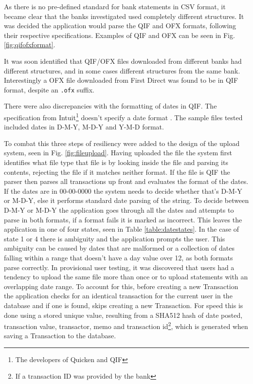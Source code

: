 As there is no pre-defined standard for bank statements in CSV format, it became clear that the banks investigated used completely different structures. It was decided the application would parse the QIF and OFX formats, following their respective specifications. Examples of QIF and OFX can be seen in Fig. \ref{fig:qifofxformat}.

It was soon identified that QIF/OFX files downloaded from different banks had different structures, and in some cases different structures from the same bank. Interestingly a OFX file downloaded from First Direct was found to be in QIF format, despite an \lstinline$.ofx$ suffix.

There were also discrepancies with the formatting of dates in QIF. The specification from Intuit\footnote{The developers of Quicken and QIF} doesn't specify a date format \cite{quiken2010qif}. The sample files tested included dates in D-M-Y, M-D-Y and Y-M-D format.



To combat this three steps of resiliency were added to the design of the upload system, seen in Fig. \ref{fig:fileupload}.
%
Having uploaded the file the system first identifies what file type that file is by looking inside the file and parsing its contents, rejecting the file if it matches neither format.
%
If the file is QIF the parser then parses all transactions up front and evaluates the format of the dates. If the dates are in 00-00-0000 the system needs to decide whether that's D-M-Y or M-D-Y, else it performs standard date parsing of the string. To decide between D-M-Y or M-D-Y the application goes through all the dates and attempts to parse in both formats, if a format fails it is marked as incorrect. This leaves the application in one of four states, seen in Table \ref{table:datestates}. In the case of state 1 or 4 there is ambiguity and the application prompts the user. This ambiguity can be caused by dates that are malformed or a collection of dates falling within a range that doesn't have a day value over 12, as both formats parse correctly. 
% 
In provisional user testing, it was discovered that users had a tendency to upload the same file more than once or to upload statements with an overlapping date range. To account for this, before creating a new Transaction the application checks for an identical transaction for the current user in the database and if one is found, skips creating a new Transaction. For speed this is done using a stored unique value, resulting from a SHA512 hash of date posted, transaction value, transactor, memo and transaction id\footnote{If a transaction ID was provided by the bank}, which is generated when saving a Transaction to the database.

